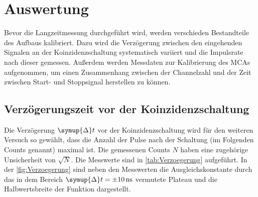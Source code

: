 \section{Auswertung}
\label{sec:Auswertung}
Bevor die Langzeitmessung durchgeführt wird, werden verschieden
Bestandteile des Aufbaus kalibriert. Dazu wird die Verzögerung 
zwischen den eingehenden Signalen an der Koinzidenzschaltung 
systematisch variiert und die Impulsrate nach dieser gemessen. 
Außerdem werden Messdaten zur Kalibrierung des MCAs
aufgenommen, um einen Zusammenhang zwischen der Channelzahl und 
der Zeit zwischen Start- und Stoppsignal herstellen zu können.
\FloatBarrier
\subsection{Verzögerungszeit vor der Koinzidenzschaltung}
Die Verzögerung $\symup{\Delta} t $ vor der Koinzidenzschaltung wird für 
den weiteren Versuch so gewählt, dass die 
Anzahl der Pulse nach der Schaltung (im Folgenden Counts genannt)
 maximal ist.
Die gemessenen Counts $N$ haben eine zugehörige 
Unsicherheit von $\sqrt{N}$. 
Die Messwerte sind in \autoref{tab:Verzoegerung} aufgeführt. In
der \autoref{fig:Verzoegerung} sind neben den Messwerten die
Ausgleichskonstante durch das in dem Bereich 
$\symup{\Delta} t = \pm 10 \, \unit{\nano\second}$ vermutete Plateau und die 
Halbwertsbreite der Funktion dargestellt.     

